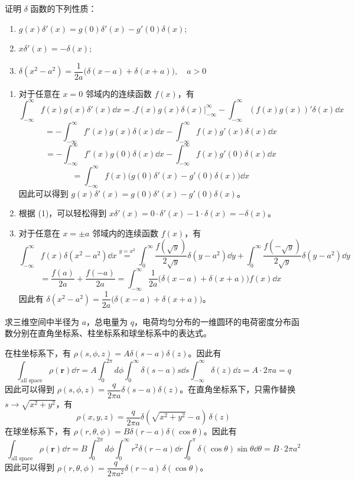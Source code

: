 
\begin{question}
证明 \(\delta\) 函数的下列性质：
\begin{enumerate}
  \item \(g(x) \delta'(x)=g(0)\delta'(x)-g'(0)\delta(x)\);
  \item \(x \delta'(x)=-\delta(x)\);
  \item \(\delta(x^2-a^2)=\dfrac1{2a}\bigl(\delta(x-a)+\delta(x+a)\bigr),\quad a>0\)
\end{enumerate}
\begin{solution}
\begin{enumerate}
  \item 对于任意在 \(x=0\) 邻域内的连续函数 \(f(x)\)，有 \[ \int_{-\infty}^\infty f(x) g(x) \delta'(x)\dd{x} =\bigl.f(x)g(x)\delta(x)\bigr|_{-\infty}^\infty-\int_{-\infty}^\infty (f(x)g(x))' \delta(x)\dd{x} \] \[ =-\int_{-\infty}^\infty f'(x) g(x) \delta(x)\dd{x} - \int_{-\infty}^\infty f(x) g'(x) \delta(x)\dd{x} \] \[ =-\int_{-\infty}^{\infty} f'(x) g(0) \delta(x)\dd{x}-\int_{-\infty}^\infty f(x) g'(0) \delta(x)\dd{x} \] \[ =\int_{-\infty}^\infty f(x) \bigl(g(0) \delta'(x) - g'(0) \delta(x)\bigr)\dd{x} \]因此可以得到 \(g(x) \delta'(x)=g(0) \delta'(x)-g'(0)\delta(x)\)。
  \item 根据 (1)，可以轻松得到 \(x \delta'(x)=0\cdot\delta'(x)-1\cdot\delta(x)=-\delta(x)\)。
  \item 对于任意在 \(x=\pm a\) 邻域内的连续函数 \(f(x)\)，有 \[ \int_{-\infty}^\infty f(x) \delta(x^2-a^2)\dd{x} \overset{y=x^2}{=} \int_0^\infty \frac{f(\sqrt{y})}{2\sqrt{y}} \delta(y-a^2)\dd{y} + \int_0^{\infty} \frac{f(-\sqrt{y})}{2\sqrt{y}} \delta(y-a^2)\dd{y} \] \[ =\frac{f(a)}{2a}+\frac{f(-a)}{2a}=\int_{-\infty}^\infty \frac1{2a}\bigl(\delta(x-a)+\delta(x+a)\bigr) f(x)\dd{x} \]因此有 \(\delta(x^2-a^2)=\dfrac1{2a}\bigl(\delta(x-a)+\delta(x+a)\bigr)\)。
\end{enumerate}
\end{solution}
\end{question}

\begin{question}
求三维空间中半径为 \(a\)，总电量为 \(q\)，电荷均匀分布的一维圆环的电荷密度分布函数分别在直角坐标系、柱坐标系和球坐标系中的表达式。
\begin{solution}
在柱坐标系下，有 \(\rho(s,\phi,z)=A\delta(s-a)\delta(z)\)。因此有 \[ \int_{\text{all space}} \rho(\bm{r})\dd{}\tau = A\int_0^{2\pi} d\phi \int_0^\infty \delta(s-a)s\dd{s} \int_{-\infty}^\infty \delta(z)\dd{z} = A\cdot 2\pi a = q \]因此可以得到 \(\rho(s,\phi,z)=\dfrac{q}{2\pi a} \delta(s-a)\delta(z)\)。在直角坐标系下，只需作替换 \(s\to\sqrt{x^2+y^2}\)，有 \[ \rho(x,y,z)=\frac{q}{2\pi a} \delta(\sqrt{x^2+y^2}-a)\,\delta(z) \]在球坐标系下，有 \(\rho(r,\theta,\phi)=B\delta(r-a)\delta(\cos\theta)\)。因此有 \[ \int_{\text{all space}} \rho(\bm{r})\dd{}\tau = B\int_0^{2\pi} d\phi \int_0^{\infty} r^2\delta(r-a)\dd{r} \int_0^\pi \delta(\cos\theta)\sin\theta\dd{}\theta = B\cdot 2\pi a^2 \]因此可以得到 \(\rho(r,\theta,\phi)=\dfrac{q}{2\pi a^2} \delta(r-a)\,\delta(\cos\theta)\)。
\end{solution}
\end{question}

